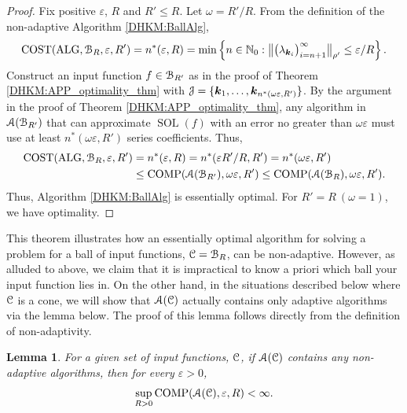 \documentclass[USenglish]{article}
\theoremstyle{dgthm}
\theoremstyle{dgthm}
\newtheorem{lemma}{Lemma}
\theoremstyle{dgthm}
\theoremstyle{dgthm}
\theoremstyle{dgdef}
\theoremstyle{definition}
\DeclareMathOperator{\SOL}{SOL}
\DeclareMathOperator{\ALG}{ALG}
\DeclareMathOperator{\COST}{COST}
\DeclareMathOperator{\COMP}{COMP}
\newcommand{\bignorm}[2][{}]{\ensuremath{\bigl \lVert #2 \bigr \rVert}_{#1}}
\begin{document}
\begin{proof}  Fix positive $\varepsilon$, $R$ and $R' \le R$.  Let $\omega = R'/R$.  From the definition of the non-adaptive Algorithm  \ref{DHKM:BallAlg}, 
\[
\COST(\ALG, \calB_R, \varepsilon,R') = n^*(\varepsilon,R) = \min \left \{n \in \N_0 : \bignorm[\rho']{\bigl(  \lambda_{\bsk_i}  \bigr)_{i = n+1}^{\infty}} \le \varepsilon /R \right \}.
\]
Construct an input function $f \in {\mathcal{B}}_{R'}$ as in the proof of Theorem \ref{DHKM:APP_optimality_thm} with ${\mathcal{J}} = \{{\boldsymbol{k}}_1, \ldots, {\boldsymbol{k}}_{n^*(\omega \varepsilon,R')} \}$. By the argument in the proof of Theorem \ref{DHKM:APP_optimality_thm}, any algorithm in ${\mathcal{A}}({\mathcal{B}}_{R'})$ that can approximate $\SOL(f)$ with an error no greater than $\omega \varepsilon$ must use at least $n^*(\omega \varepsilon,R')$ series coefficients.  Thus, 
\begin{align*}
\COST(\ALG, \calB_R, \varepsilon,R') & =  n^*(\varepsilon,R) 
= n^*(\varepsilon R'/R,R') = n^*(\omega \varepsilon, R')
\\
& \le \COMP(\calA(\calB_{R'}),\omega \varepsilon, R') \le  \COMP(\calA(\calB_{R}),\omega \varepsilon, R').
\end{align*}
Thus, Algorithm \ref{DHKM:BallAlg} is essentially optimal. For $R'=R \ (\omega = 1)$, we have optimality.
\end{proof}

\hspace{\parindent} This theorem illustrates how an essentially optimal algorithm for solving a problem for a ball of input functions, ${\mathcal{C}} = {\mathcal{B}}_R$, can be non-adaptive.  However, as alluded to above, we claim that it is impractical to know a priori which ball your input function lies in.  On the other hand, in the situations described below where ${\mathcal{C}}$ is a cone, we will show that ${\mathcal{A}}({\mathcal{C}})$ actually contains only adaptive algorithms via the lemma below.  The proof of this lemma follows directly from the definition of non-adaptivity.

\begin{lemma} \label{DHKM:NoNonAdpatLem}
For a given set of input functions, ${\mathcal{C}}$, if  ${\mathcal{A}}({\mathcal{C}})$ contains any non-adaptive algorithms, then for every $\varepsilon > 0$,
\begin{equation*}
    \sup_{R > 0} \COMP(\calA(\calC),\varepsilon, R) < \infty.
\end{equation*}
\end{lemma}
\end{document}
